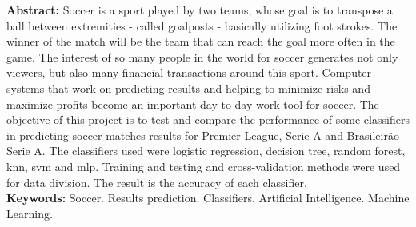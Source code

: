 \begin{singlespace}
\textbf{Abstract: }
Soccer is a sport played by two teams, whose goal is to transpose a ball between extremities - called goalposts - basically utilizing foot strokes. The winner of the match will be the team that can reach the goal more often in the game. The interest of so many people in the world for soccer generates not only viewers, but also many financial transactions around this sport. Computer systems that work on predicting results and helping to minimize risks and maximize profits become an important day-to-day work tool for soccer. The objective of this project is to test and compare the performance of some classifiers in predicting soccer matches results for Premier League, Serie A and Brasileirão Serie A. The classifiers used were logistic regression, decision tree, random forest, knn, svm and mlp. Training and testing and cross-validation methods were used for data division. The result is the accuracy of each classifier.\\
\textbf{Keywords: }
Soccer. Results prediction. Classifiers. Artificial Intelligence. Machine Learning.
\end{singlespace}